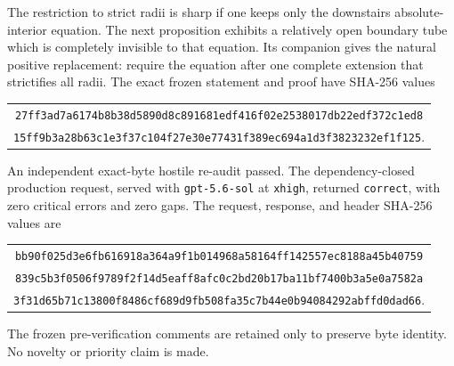 The restriction to strict radii is sharp if one keeps only the downstairs
absolute-interior equation.  The next proposition exhibits a relatively open
boundary tube which is completely invisible to that equation.  Its companion
gives the natural positive replacement: require the equation after one
complete extension that strictifies all radii.  The exact frozen statement
and proof have SHA-256 values
\begin{center}
\small
\begin{tabular}{@{}c@{}}
\nolinkurl{27ff3ad7a6174b8b38d5890d8c891681edf416f02e2538017db22edf372c1ed8}\\
\nolinkurl{15ff9b3a28b63c1e3f37c104f27e30e77431f389ec694a1d3f3823232ef1f125}.
\end{tabular}
\end{center}
An independent exact-byte hostile re-audit passed.  The dependency-closed
production request, served with \texttt{gpt-5.6-sol} at \texttt{xhigh},
returned \texttt{correct}, with zero critical errors and zero gaps.  The
request, response, and header SHA-256 values are
\begin{center}
\small
\begin{tabular}{@{}c@{}}
\nolinkurl{bb90f025d3e6fb616918a364a9f1b014968a58164ff142557ec8188a45b40759}\\
\nolinkurl{839c5b3f0506f9789f2f14d5eaff8afc0c2bd20b17ba11bf7400b3a5e0a7582a}\\
\nolinkurl{3f31d65b71c13800f8486cf689d9fb508fa35c7b44e0b94084292abffd0dad66}.
\end{tabular}
\end{center}
The frozen pre-verification comments are retained only to preserve byte
identity.  No novelty or priority claim is made.

\begingroup
\providecommand{\an}{\mathrm{an}}


\begingroup
\makeatletter
\let\pzerosixtwononstrict@original@nonumberplain\th@nonumberplain
\def\th@nonumberplain{%
  \pzerosixtwononstrict@original@nonumberplain
  \def\@opargbegintheorem##1##2##3{%
    \item[\theorem@headerfont\hskip\labelsep ##3\theorem@separator]}}
\makeatother

\endgroup
\endgroup

